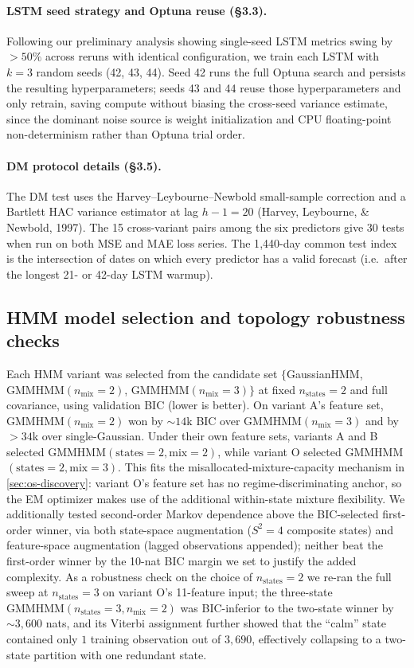 \documentclass{article}
\begin{document}
\paragraph{LSTM seed strategy and Optuna reuse (\S 3.3).} Following our preliminary analysis showing single-seed LSTM metrics swing by $>50\%$ across reruns with identical configuration, we train each LSTM with $k=3$ random seeds (42, 43, 44). Seed 42 runs the full Optuna search and persists the resulting hyperparameters; seeds 43 and 44 reuse those hyperparameters and only retrain, saving compute without biasing the cross-seed variance estimate, since the dominant noise source is weight initialization and CPU floating-point non-determinism rather than Optuna trial order.

\paragraph{DM protocol details (\S 3.5).} The DM test uses the Harvey--Leybourne--Newbold small-sample correction and a Bartlett HAC variance estimator at lag $h{-}1 = 20$ (Harvey, Leybourne, \& Newbold, 1997). The 15 cross-variant pairs among the six predictors give 30 tests when run on both MSE and MAE loss series. The 1{,}440-day common test index is the intersection of dates on which every predictor has a valid forecast (i.e.\ after the longest 21- or 42-day LSTM warmup).

\subsection{HMM model selection and topology robustness checks}
\label{app:hmm-checks}

Each HMM variant was selected from the candidate set $\{$GaussianHMM, GMMHMM$(n_{\text{mix}}=2)$, GMMHMM$(n_{\text{mix}}=3)\}$ at fixed $n_{\text{states}}=2$ and full covariance, using validation BIC (lower is better). On variant A's feature set, GMMHMM$(n_{\text{mix}}=2)$ won by $\sim 14$k BIC over GMMHMM$(n_{\text{mix}}=3)$ and by $>34$k over single-Gaussian. Under their own feature sets, variants A and B selected GMMHMM$(\text{states}=2, \text{mix}=2)$, while variant O selected GMMHMM$(\text{states}=2, \text{mix}=3)$. This fits the misallocated-mixture-capacity mechanism in \cref{sec:os-discovery}: variant O's feature set has no regime-discriminating anchor, so the EM optimizer makes use of the additional within-state mixture flexibility. We additionally tested second-order Markov dependence above the BIC-selected first-order winner, via both state-space augmentation ($S^2 = 4$ composite states) and feature-space augmentation (lagged observations appended); neither beat the first-order winner by the 10-nat BIC margin we set to justify the added complexity. As a robustness check on the choice of $n_{\text{states}} = 2$ we re-ran the full sweep at $n_{\text{states}} = 3$ on variant O's 11-feature input; the three-state $\mathrm{GMMHMM}(n_{\text{states}}=3, n_{\text{mix}}=2)$ was BIC-inferior to the two-state winner by $\sim 3{,}600$ nats, and its Viterbi assignment further showed that the ``calm'' state contained only $1$ training observation out of $3{,}690$, effectively collapsing to a two-state partition with one redundant state.
\end{document}
